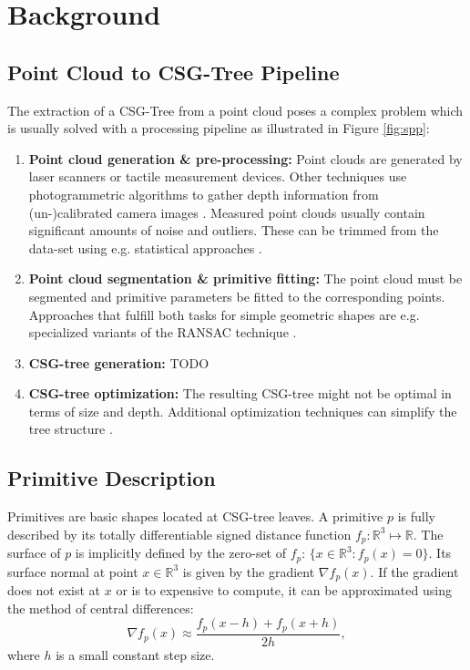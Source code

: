 \section{Background}
\subsection{Point Cloud to \ac{CSG}-Tree Pipeline} 
The extraction of a \ac{CSG}-Tree from a point cloud poses a complex problem which is usually solved with a processing pipeline as illustrated in Figure \ref{fig:spp}:  
\begin{enumerate}
	
	\item \textbf{Point cloud generation \& pre-processing:} Point clouds are generated by laser scanners or tactile measurement devices. 
Other techniques use photogrammetric algorithms to gather depth information from (un-)calibrated camera images \cite{hartley2003multiple}.
Measured point clouds usually contain significant amounts of noise and outliers. 
These can be trimmed from the data-set using e.g. statistical approaches  \cite{rusu20113d}.
\\
\item \textbf{Point cloud segmentation \& primitive fitting:} The point cloud must be segmented and primitive parameters be fitted to the corresponding points. Approaches that fulfill both tasks for simple geometric shapes are e.g. specialized variants of the \ac{RANSAC} technique \cite{schnabel2007efficient}.
\\
\item \textbf{\ac{CSG}-tree generation:} TODO
\\
\item \textbf {\ac{CSG}-tree optimization:} The resulting \ac{CSG}-tree might not be optimal in terms of size and depth.
Additional optimization techniques can simplify the tree structure \cite{weiss2009geometry, shapiro1991construction}. 
\end{enumerate}
	
\subsection{Primitive Description}
Primitives are basic shapes located at \ac{CSG}-tree leaves. 
A primitive $p$ is fully described by its totally differentiable signed distance function $f_p: \mathbb{R}^3 \mapsto \mathbb{R}$.
The surface of $p$ is implicitly defined by the zero-set of $f_p$: $\{x \in \mathbb{R}^3 : f_p(x)=0\}$.
Its surface normal at point $x \in \mathbb{R}^3$ is given by the gradient $\nabla f_p(x)$.
If the gradient does not exist at $x$ or is to expensive to compute, it can be approximated using the method of central differences:
\begin{equation}
\nabla f_p(x) \approx \frac{f_p(x - h) + f_p(x + h)}{2h},
\end{equation}
where $h$ is a small constant step size.


